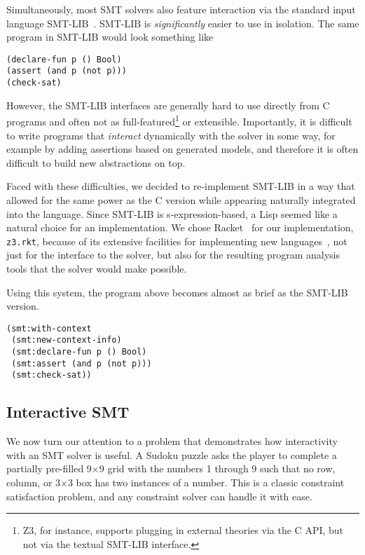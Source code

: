 Simultaneously, most SMT solvers also feature interaction via the standard input
language SMT-LIB~\cite{smtlib2:10}. SMT-LIB is \textit{significantly} easier to
use in isolation. The same program in SMT-LIB would look something like

\begin{verbatim}
(declare-fun p () Bool)
(assert (and p (not p)))
(check-sat)
\end{verbatim}

However, the SMT-LIB interfaces are generally hard to use directly from C
programs and often not as full-featured\footnote{Z3, for instance, supports
  plugging in external theories via the C API, but not via the textual SMT-LIB
  interface.}  or extensible. Importantly, it is difficult to write programs
that \textit{interact} dynamically with the solver in some way, for example by
adding assertions based on generated models, and therefore it is often difficult
to build new abstractions on top.

Faced with these difficulties, we decided to re-implement SMT-LIB in a way that
allowed for the same power as the C version while appearing naturally integrated
into the language. Since SMT-LIB is s-expression-based, a Lisp seemed like a
natural choice for an implementation. We chose Racket~\cite{racket} for our
implementation, \texttt{z3.rkt}, because of its extensive facilities for
implementing new languages~\cite{Tobin-Hochstadt:11}, not just for the interface
to the solver, but also for the resulting program analysis tools that the solver
would make possible.

Using this system, the program above becomes almost as brief as the SMT-LIB
version.

\begin{verbatim}
(smt:with-context
 (smt:new-context-info)
 (smt:declare-fun p () Bool)
 (smt:assert (and p (not p)))
 (smt:check-sat))
\end{verbatim}

\subsection{Interactive SMT}

We now turn our attention to a problem that demonstrates how interactivity with
an SMT solver is useful. A Sudoku puzzle asks the player to complete a partially
pre-filled 9$\times$9 grid with the numbers 1 through 9 such that no row,
column, or 3$\times$3 box has two instances of a number. This is a classic
constraint satisfaction problem, and any constraint solver can handle it with
ease.

